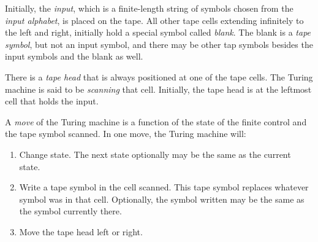 \documentclass[]{article}
\begin{document}
    Initially, the \emph{input}, which is a finite-length string of symbols 
    chosen from the \emph{input alphabet}, is placed on the tape. All other 
    tape cells extending infinitely to the left and right, initially hold a 
    special symbol called \emph{blank}. The blank is a \emph{tape symbol}, but 
    not an input symbol, and there may be other tap symbols besides the input 
    symbols and the blank as well.
    
    There is a \emph{tape head} that is always positioned at one of the tape 
    cells. The Turing machine is said to be \emph{scanning} that cell. 
    Initially, the tape head is at the leftmost cell that holds the input.
    
    A \emph{move} of the Turing machine is a function of the state of the 
    finite control and the tape symbol scanned. In one move, the Turing machine 
    will:
      \begin{enumerate}
        \item Change state. The next state optionally may be the same as the
        current state.
        \item Write a tape symbol in the cell scanned. This tape symbol 
        replaces whatever symbol was in that cell. Optionally, the symbol 
        written may be the same as the symbol currently there.
        \item Move the tape head left or right.
      \end{enumerate}
      
\end{document}
